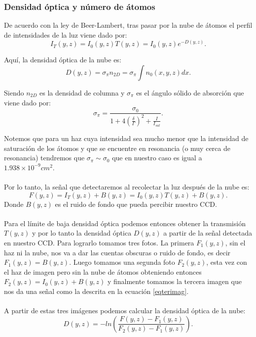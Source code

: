 \documentclass[12pt,twoside]{article}
\begin{document}
\subsubsection{Densidad óptica y número de átomos}\label{teoDOynum}
De acuerdo con la ley de Beer-Lambert, tras pasar por la nube de átomos el perfil de intensidades de la luz viene dado por:
\begin{equation}
I_{T}(y,z) = I_{0}(y,z)T(y,z) = I_{0}(y,z) e^{-D(y,z)}.
\end{equation}

Aquí, la densidad óptica de la nube es:
\begin{equation}
D(y,z) = \sigma_{\pi} n_{2D} = \sigma_{\pi} \int n_{0}(x,y,z) dx.
\end{equation}

Siendo $n_{2D}$ es la densidad de columna y $\sigma_{\pi}$ es el ángulo sólido de absorción que viene dado por:
\begin{equation}
\sigma_{\pi} = \frac{\sigma_{0}}{1 + 4(\frac{\delta}{\Gamma})^2 + \frac{I}{I_{sat}}}.
\end{equation}

Notemos que para un haz cuya intensidad sea mucho menor que la intensidad de saturación de los átomos y que se encuentre en resonancia (o muy cerca de resonancia) tendremos que $\sigma_{\pi} \sim \sigma_{0}$ que en nuestro caso es igual a $1.938 \times 10^{-9} cm^2$.\cite{Steck}\\
\\
Por lo tanto, la señal que detectaremos al recolectar la luz después de la nube es:
\begin{equation}
F(y,z) = I_{T}(y,z) + B(y,z) = I_{0}(y,z)T(y,z) + B(y,z).\label{eqterimag}
\end{equation}
Donde $B(y,z)$ es el ruido de fondo que pueda percibir nuestro CCD.\\
\\
Para el límite de baja densidad óptica podemos entonces obtener la transmisión $T(y,z)$ y por lo tanto la densidad óptica $D(y,z)$ a partir de la señal detectada en nuestro CCD. Para lograrlo tomamos tres fotos. La primera $F_{1}(y,z)$, sin el haz ni la nube, nos va a dar las cuentas obscuras o ruido de fondo, es decir $F_{1}(y,z)=B(y,z)$. Luego tomamos una segunda foto $F_{2}(y,z)$, esta vez con el haz de imagen pero sin la nube de átomos obteniendo entonces $F_{2}(y,z) = I_{0}(y,z) + B(y,z)$ y finalmente tomamos la tercera imagen que nos da una señal como la descrita en la ecuación \ref{eqterimag}.\\
\\
A partir de estas tres imágenes podemos calcular la densidad óptica de la nube: 
\begin{equation}
D(y,z) = - ln\left(\frac{F(y,z)-F_{1}(y,z)}{F_{2}(y,z)-F_{1}(y,z)}\right).
\end{equation}
\end{document}
